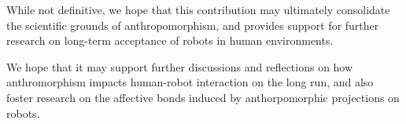 \documentclass{sig-alternate-2013}
\begin{document}
While not definitive, we hope that this contribution may ultimately consolidate
the scientific grounds of anthropomorphism, and provides support for further
research on long-term acceptance of robots in human environments.

We hope that it may support further
discussions and reflections on how anthromorphism impacts human-robot
interaction on the long run, and also foster research on the affective bonds
induced by anthorpomorphic projections on robots.



 
\end{document}
